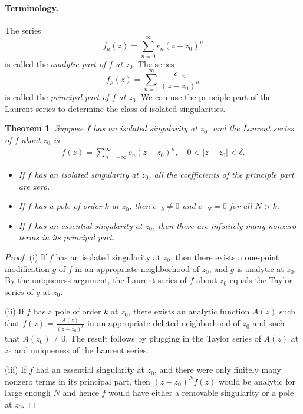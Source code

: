 \documentclass{article}
\numberwithin{equation}{section}
\theoremstyle{plain}
\newtheorem{theorem}{Theorem}[section]
\theoremstyle{definition}
\begin{document}
\paragraph{Terminology.} The series $$f_a(z)=\sum_{n=0}^\infty c_n(z-z_0)^n$$ is called the \textit{analytic part of $f$ at $z_0$}.
The series $$f_p(z)=\sum_{n=1}^{\infty}\frac{c_{-n}}{(z-z_0)^n}$$ is called the \textit{principal part of $f$ at $z_0$}. We can use the principle part of the Laurent series to determine the class of isolated singularities.

\begin{theorem}\label{laurentsingularity}
Suppose $f$ has an isolated singularity at $z_0$, and the Laurent series of $f$ about $z_0$ is
\begin{align*}
	f(z)=\sum_{n=-\infty}^\infty c_n(z-z_0)^n,\quad 0<\vert z-z_0\vert<\delta.
\end{align*}
\begin{itemize}
\item[(i)] If $f$ has an isolated singularity at $z_0$, all the coefficients of the principle part are zero. 
\item[(ii)] If $f$ has a pole of order $k$ at $z_0$, then $c_{-k}\neq 0$ and $c_{-N}=0$ for all $N>k$. 
\item[(iii)] If $f$ has an essential singularity at $z_0$, then there are infinitely many nonzero terms in its principal part.
\end{itemize}
\end{theorem}
\begin{proof}
(i) If $f$ has an isolated singularity at $z_0$, then there exists a one-point modification $g$ of $f$ in an appropriate neighborhood of $z_0$, and $g$ is analytic at $z_0$. By the uniqueness argument, the Laurent series of $f$ about $z_0$ equals the Taylor series of $g$ at $z_0$.

(ii) If $f$ has a pole of order $k$ at $z_0$, there exists an analytic function $A(z)$ such that $f(z)=\frac{A(z)}{(z-z_0)^k}$ in an appropriate deleted neighborhood of $z_0$ and such that $A(z_0)\neq 0$. The result follows by plugging in the Taylor series of $A(z)$ at $z_0$ and uniqueness of the Laurent series.

(iii) If $f$ had an essential singularity at $z_0$, and there were only finitely many nonzero terms in its principal part, then $(z-z_0)^N f(z)$ would be analytic for large enough $N$ and hence $f$ would have either a removable singularity or a pole at $z_0$.
\end{proof}
\end{document}
